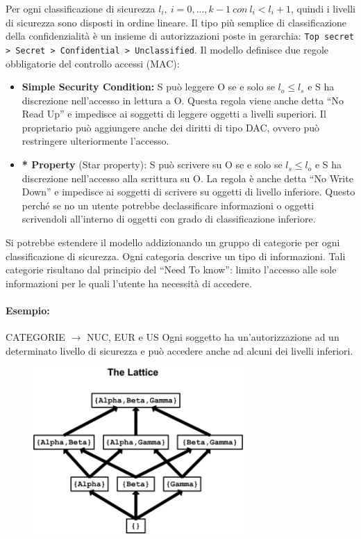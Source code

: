 Per ogni classificazione di sicurezza \(l_i, \ i=0,...,k-1 \ con \ l_i<l_i+1\),
quindi i livelli di sicurezza sono
disposti in ordine lineare.
Il tipo più semplice di classificazione della confidenzialità è un insieme di
autorizzazioni poste in
gerarchia: \verb|Top secret > Secret > Confidential > Unclassified|.
Il modello definisce due regole obbligatorie del controllo accessi (MAC):
\begin{itemize}
      \item \textbf{Simple Security Condition:} S può leggere O se e solo se
            \(l_o \le l_s\) e S ha discrezione
            nell’accesso in lettura a O. Questa regola viene anche detta “No Read Up”
            e impedisce ai
            soggetti di leggere oggetti a livelli superiori. Il proprietario può
            aggiungere anche dei diritti di
            tipo DAC, ovvero può restringere ulteriormente l’accesso.
      \item \textbf{* Property} (Star property): S può scrivere su O se e solo
            se \(l_s \le l_o\) e S ha discrezione
            nell’accesso alla scrittura su O. La regola è anche detta “No Write Down”
            e impedisce ai
            soggetti di scrivere su oggetti di livello inferiore. Questo perché se no
            un utente potrebbe declassificare
            informazioni o oggetti scrivendoli all'interno di oggetti con grado di
            classificazione inferiore.
\end{itemize}

Si potrebbe estendere il modello addizionando un gruppo di categorie per ogni
classificazione di
sicurezza. Ogni categoria descrive un tipo di informazioni.
Tali categorie risultano dal principio del “Need To know”: limito l’accesso alle
sole informazioni per
le quali l’utente ha necessità di accedere.

\paragraph{Esempio:} %
CATEGORIE \(\rightarrow\) NUC, EUR e US
Ogni soggetto ha un’autorizzazione ad un determinato livello di sicurezza e può
accedere anche
ad alcuni dei livelli inferiori.

\begin{figure}[H]
      \centering
      \includegraphics[width=8cm, keepaspectratio]{capitoli/policy/imgs/Lattuce.jpg}
\end{figure}

